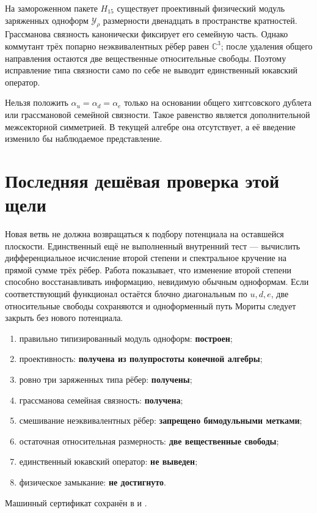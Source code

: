 \begin{theorem}
На замороженном пакете $H_{15}$ существует проективный физический модуль
заряженных одноформ $\mathcal Y_\rho$ размерности двенадцать в пространстве
кратностей. Грассманова связность канонически фиксирует его семейную часть.
Однако коммутант трёх попарно неэквивалентных рёбер равен $\mathbb C^3$;
после удаления общего направления остаются две вещественные относительные
свободы. Поэтому исправление типа связности само по себе не выводит
единственный юкавский оператор.
\end{theorem}

\begin{nogocriterion}
Нельзя положить $\alpha_u=\alpha_d=\alpha_e$ только на основании общего
хиггсовского дублета или грассмановой семейной связности. Такое равенство
является дополнительной межсекторной симметрией. В текущей алгебре она
отсутствует, а её введение изменило бы наблюдаемое представление.
\end{nogocriterion}

\section{Последняя дешёвая проверка этой щели}

Новая ветвь не должна возвращаться к подбору потенциала на оставшейся
плоскости. Единственный ещё не выполненный внутренний тест --- вычислить
дифференциальное исчисление второй степени и спектральное кручение на прямой
сумме трёх рёбер. Работа  показывает, что изменение
второй степени способно восстанавливать информацию, невидимую обычным
одноформам. Если соответствующий функционал остаётся блочно диагональным по
$u,d,e$, две относительные свободы сохраняются и одноформенный путь Мориты
следует закрыть без нового потенциала.

\begin{protocol}
\begin{enumerate}
 \item правильно типизированный модуль одноформ: \textbf{построен};
 \item проективность: \textbf{получена из полупростоты конечной алгебры};
 \item ровно три заряженных типа рёбер: \textbf{получены};
 \item грассманова семейная связность: \textbf{получена};
 \item смешивание неэквивалентных рёбер:
 \textbf{запрещено бимодульными метками};
 \item остаточная относительная размерность:
 \textbf{две вещественные свободы};
 \item единственный юкавский оператор: \textbf{не выведен};
 \item физическое замыкание: \textbf{не достигнуто}.
\end{enumerate}
\end{protocol}

Машинный сертификат сохранён в
 и
.